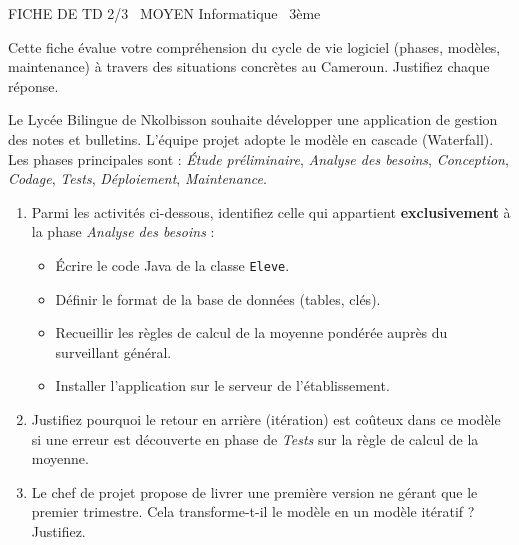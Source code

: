 \documentclass[11pt]{article}
\begin{document}
\begin{tcolorbox}[enhanced,colback=popink,colframe=popink,arc=10pt,boxrule=0pt,left=12pt,right=12pt,top=9pt,bottom=9pt]
{\color{white}\popxbold\small FICHE DE TD 2/3 \textbullet\ MOYEN \hfill Informatique \textbullet\ 3ème\par}
\end{tcolorbox}
\vspace{4pt}
\noindent Cette fiche évalue votre compréhension du cycle de vie logiciel (phases, modèles, maintenance) à travers des situations concrètes au Cameroun. Justifiez chaque réponse.

\begin{exercice}
Le Lycée Bilingue de Nkolbisson souhaite développer une application de gestion des notes et bulletins. L'équipe projet adopte le modèle en cascade (Waterfall). Les phases principales sont : \textit{Étude préliminaire}, \textit{Analyse des besoins}, \textit{Conception}, \textit{Codage}, \textit{Tests}, \textit{Déploiement}, \textit{Maintenance}.
\begin{enumerate}
    \item Parmi les activités ci-dessous, identifiez celle qui appartient \textbf{exclusivement} à la phase \textit{Analyse des besoins} :
    \begin{itemize}
        \item[A] Écrire le code Java de la classe \texttt{Eleve}.
        \item[B] Définir le format de la base de données (tables, clés).
        \item[C] Recueillir les règles de calcul de la moyenne pondérée auprès du surveillant général.
        \item[D] Installer l'application sur le serveur de l'établissement.
    \end{itemize}
    \item Justifiez pourquoi le retour en arrière (itération) est coûteux dans ce modèle si une erreur est découverte en phase de \textit{Tests} sur la règle de calcul de la moyenne.
    \item Le chef de projet propose de livrer une première version ne gérant que le premier trimestre. Cela transforme-t-il le modèle en un modèle itératif ? Justifiez.
\end{enumerate}
\end{exercice}
\end{document}
